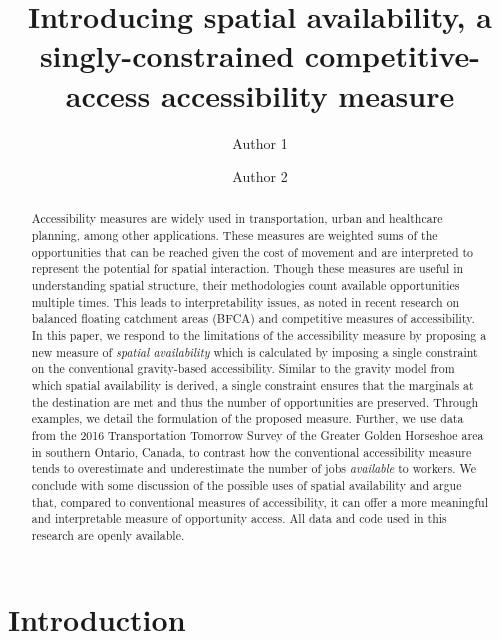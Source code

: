 \documentclass[]{elsarticle} %
\begin{document}
\begin{frontmatter}

  \title{Introducing spatial availability, a singly-constrained
competitive-access accessibility measure}
    \author[School]{Author 1}
    \author[School]{Author 2}
      \address[School]{Some School}
  
  \begin{abstract}
  Accessibility measures are widely used in transportation, urban and
  healthcare planning, among other applications. These measures are
  weighted sums of the opportunities that can be reached given the cost
  of movement and are interpreted to represent the potential for spatial
  interaction. Though these measures are useful in understanding spatial
  structure, their methodologies count available opportunities multiple
  times. This leads to interpretability issues, as noted in recent
  research on balanced floating catchment areas (BFCA) and competitive
  measures of accessibility. In this paper, we respond to the
  limitations of the accessibility measure by proposing a new measure of
  \emph{spatial availability} which is calculated by imposing a single
  constraint on the conventional gravity-based accessibility. Similar to
  the gravity model from which spatial availability is derived, a single
  constraint ensures that the marginals at the destination are met and
  thus the number of opportunities are preserved. Through examples, we
  detail the formulation of the proposed measure. Further, we use data
  from the 2016 Transportation Tomorrow Survey of the Greater Golden
  Horseshoe area in southern Ontario, Canada, to contrast how the
  conventional accessibility measure tends to overestimate and
  underestimate the number of jobs \emph{available} to workers. We
  conclude with some discussion of the possible uses of spatial
  availability and argue that, compared to conventional measures of
  accessibility, it can offer a more meaningful and interpretable
  measure of opportunity access. All data and code used in this research
  are openly available.
  \end{abstract}
  
 \end{frontmatter}

\newpage

\hypertarget{introduction}{%
\section{Introduction}\label{introduction}}
\end{document}
